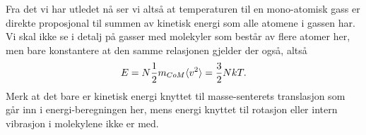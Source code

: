 Fra det vi har utledet nå ser vi altså at temperaturen til en mono-atomisk gass er direkte proposjonal til summen av kinetisk energi som alle atomene i gassen har. Vi skal ikke se i detalj på gasser med molekyler som består av flere atomer her, men bare konstantere at den samme relasjonen gjelder der også, altså
\begin{displaymath}
	E = N\frac{1}{2} m_{CoM}\langle v^2\rangle = \frac{3}{2}NkT.
\end{displaymath}
Merk at det bare er kinetisk energi knyttet til masse-senterets translasjon som går inn i energi-beregningen her, mens energi knyttet til rotasjon eller intern vibrasjon i molekylene ikke er med.


%



